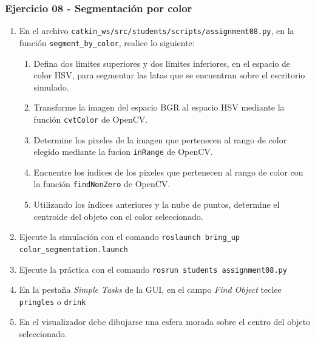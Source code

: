 \begin{frame}\frametitle{Ejercicio 08 - Segmentación por color}
  \begin{enumerate}
  \item En el archivo \texttt{catkin\_ws/src/students/scripts/assignment08.py}, en la función \texttt{segment\_by\_color}, realice lo siguiente:
    \begin{enumerate}
    \item Defina dos límites superiores y dos límites inferiores, en el espacio de color HSV, para segmentar las latas que se encuentran sobre el escritorio simulado.
    \item Transforme la imagen del espacio BGR al espacio HSV mediante la función \texttt{cvtColor} de OpenCV.
    \item Determine los pixeles de la imagen que pertenecen al rango de color elegido mediante la fucion \texttt{inRange} de OpenCV.
    \item Encuentre los índices de los pixeles que pertenecen al rango de color con la función \texttt{findNonZero} de OpenCV.
    \item Utilizando los índices anteriores y la nube de puntos, determine el centroide del objeto con el color seleccionado. 
    \end{enumerate}
  \item Ejecute la simulación con el comando \texttt{roslaunch bring\_up color\_segmentation.launch }
  \item Ejecute la práctica con el comando \texttt{rosrun students assignment08.py}
  \item En la pestaña \textit{Simple Tasks} de la GUI, en el campo \textit{Find Object} teclee \texttt{pringles} o \texttt{drink}
  \item En el visualizador debe dibujarse una esfera morada sobre el centro del objeto seleccionado. 
  \end{enumerate}
\end{frame}


